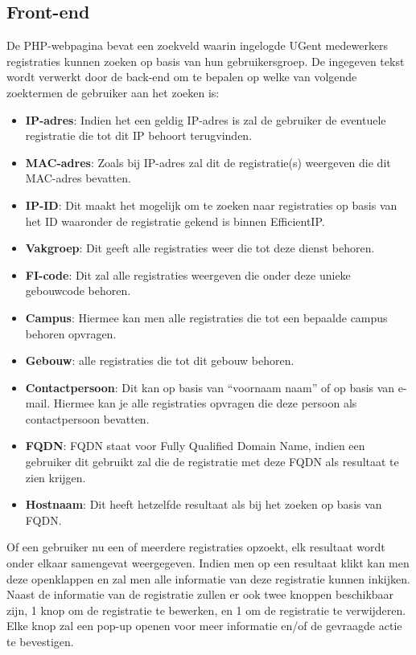 \subsection{Front-end}
De PHP-webpagina bevat een zoekveld waarin ingelogde UGent medewerkers registraties kunnen zoeken op basis van hun gebruikersgroep. De ingegeven tekst wordt verwerkt door de back-end om te bepalen op welke van volgende zoektermen de gebruiker aan het zoeken is:
\begin{itemize}
    \item \textbf{IP-adres}: Indien het een geldig IP-adres is zal de gebruiker de eventuele registratie die tot dit IP behoort terugvinden.
    \item \textbf{MAC-adres}: Zoals bij IP-adres zal dit de registratie(s) weergeven die dit MAC-adres bevatten.
    \item \textbf{IP-ID}: Dit maakt het mogelijk om te zoeken naar registraties op basis van het ID waaronder de registratie gekend is binnen EfficientIP. 
    \item \textbf{Vakgroep}: Dit geeft alle registraties weer die tot deze dienst behoren.
    \item \textbf{FI-code}: Dit zal alle registraties weergeven die onder deze unieke gebouwcode behoren.
    \item \textbf{Campus}: Hiermee kan men alle registraties die tot een bepaalde campus behoren opvragen.
    \item \textbf{Gebouw}: alle registraties die tot dit gebouw behoren.
    \item \textbf{Contactpersoon}: Dit kan op basis van “voornaam naam” of op basis van e-mail. Hiermee kan je alle registraties opvragen die deze persoon als contactpersoon bevatten.
    \item \textbf{FQDN}: FQDN staat voor Fully Qualified Domain Name, indien een gebruiker dit gebruikt zal die de registratie met deze FQDN als resultaat te zien krijgen.
    \item \textbf{Hostnaam}: Dit heeft hetzelfde resultaat als bij het zoeken op basis van FQDN.
\end{itemize}
Of een gebruiker nu een of meerdere registraties opzoekt, elk resultaat wordt onder elkaar samengevat weergegeven. Indien men op een resultaat klikt kan men deze openklappen en zal men alle informatie van deze registratie kunnen inkijken. Naast de informatie van de registratie zullen er ook twee knoppen beschikbaar zijn, 1 knop om de registratie te bewerken, en 1 om de registratie te verwijderen.
Elke knop zal een pop-up openen voor meer informatie en/of de gevraagde actie te bevestigen.

